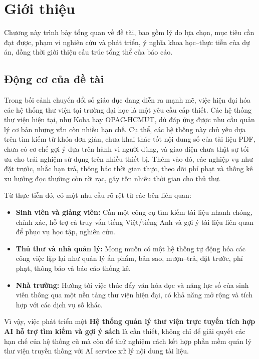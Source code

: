 
\chapter{Giới thiệu}
\label{chap:GioiThieu}

Chương này trình bày tổng quan về đề tài, bao gồm lý do lựa chọn, mục tiêu cần
đạt được, phạm vi nghiên cứu và phát triển, ý nghĩa khoa học--thực tiễn của dự
án, đồng thời giới thiệu cấu trúc tổng thể của báo cáo.
\section{Động cơ của đề tài}
\label{sec:DongCo}

Trong bối cảnh chuyển đổi số giáo dục đang diễn ra mạnh mẽ, việc hiện đại hóa
các hệ thống thư viện tại trường đại học là một yêu cầu cấp thiết. Các hệ thống
thư viện hiện tại, như Koha hay OPAC-HCMUT, dù đáp ứng được nhu cầu quản lý cơ
bản nhưng vẫn còn nhiều hạn chế. Cụ thể, các hệ thống này chủ yếu dựa trên tìm
kiếm từ khóa đơn giản, chưa khai thác tốt nội dung số của tài liệu PDF, chưa có
cơ chế gợi ý dựa trên hành vi người dùng, và giao diện chưa thật sự tối ưu cho
trải nghiệm sử dụng trên nhiều thiết bị. Thêm vào đó, các nghiệp vụ như đặt
trước, nhắc hạn trả, thông báo thời gian thực, theo dõi phí phạt và thống kê xu
hướng đọc thường còn rời rạc, gây tốn nhiều thời gian cho thủ thư.

Từ thực tiễn đó, có một nhu cầu rõ rệt từ các bên liên quan:
\begin{itemize}
    \item \textbf{Sinh viên và giảng viên:} Cần một công cụ tìm kiếm tài liệu
    nhanh chóng, chính xác, hỗ trợ cả truy vấn tiếng Việt/tiếng Anh và gợi ý tài
    liệu liên quan để phục vụ học tập, nghiên cứu.
    \item \textbf{Thủ thư và nhà quản lý:} Mong muốn có một hệ thống tự động hóa
    các công việc lặp lại như quản lý ấn phẩm, bản sao, mượn--trả, đặt trước,
    phí phạt, thông báo và báo cáo thống kê.
    \item \textbf{Nhà trường:} Hướng tới việc thúc đẩy văn hóa đọc và năng lực
    số của sinh viên thông qua một nền tảng thư viện hiện đại, có khả năng mở
    rộng và tích hợp với các dịch vụ số khác.
\end{itemize}

Vì vậy, việc phát triển một \textbf{Hệ thống quản lý thư viện trực tuyến tích
hợp AI hỗ trợ tìm kiếm và gợi ý sách} là cần thiết, không chỉ để giải quyết các
hạn chế của hệ thống cũ mà còn để thử nghiệm cách kết hợp phần mềm quản lý thư
viện truyền thống với AI service xử lý nội dung tài liệu.

